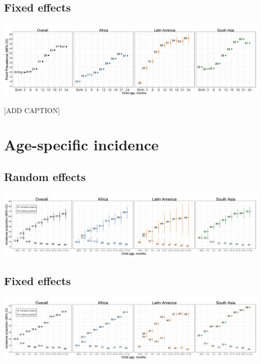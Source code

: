 \documentclass[9pt,]{book}
\begin{document}
\hypertarget{fixed-effects-1}{%
\subsection{Fixed effects}\label{fixed-effects-1}}

\includegraphics[width=58.33in]{figure-copies/fig-stunt-2-prev-overall_region--allage-fe}

{[}ADD CAPTION{]}

\hypertarget{age-specific-incidence}{%
\section{Age-specific incidence}\label{age-specific-incidence}}

\hypertarget{random-effects-1}{%
\subsection{Random effects}\label{random-effects-1}}

\includegraphics[width=66.67in]{figure-copies/fig-stunt-2-inc-overall_region--allage-primary}

\hypertarget{fixed-effects-2}{%
\subsection{Fixed effects}\label{fixed-effects-2}}

\includegraphics[width=66.67in]{figure-copies/fig-stunt-2-inc-overall_region--allage-fe}
\end{document}
